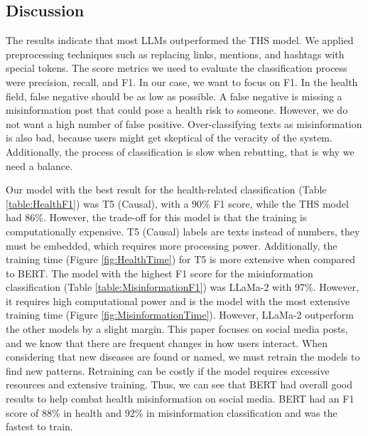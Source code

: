 \subsection{Discussion}

The results indicate that most LLMs outperformed the THS model. We applied preprocessing techniques such as replacing links, mentions, and hashtags with special tokens.
The score metrics we used to evaluate the classification process were precision, recall, and F1. In our case, we want to focus on F1. In the health field, false negative should be
as low as possible. A false negative is missing a misinformation post that could pose a health risk to someone. However, we do not want a high number of false positive. Over-classifying 
texts as misinformation is also bad, because users might get skeptical of the veracity of the system. Additionally, the process of classification is slow when rebutting, that is why we need a balance.

Our model with the best result for the health-related classification (Table \ref{table:HealthF1}) was T5 (Causal), with a 90\% F1 score, while the THS model had 86\%. However, the trade-off
for this model is that the training is computationally expensive. T5 (Causal) labels are texts instead of numbers, they must be embedded, which requires more processing power. Additionally,
the training time (Figure \ref{fig:HealthTime}) for T5 is more extensive when compared to BERT.
The model with the highest F1 score for the misinformation classification (Table \ref{table:MisinformationF1}) was LLaMa-2 with 97\%. However, it requires high computational power and is
the model with the most extensive training time (Figure \ref{fig:MisinformationTime}). However, LLaMa-2 outperform the other models by a slight margin. 
This paper focuses on social media posts, and we know that there are frequent changes in how users interact. When considering that new diseases are found or named, we must retrain the
models to find new patterns. Retraining can be costly if the model requires excessive resources and extensive training. 
Thus, we can see that BERT had overall good results to help combat health misinformation on social media. BERT had an F1 score of 88\% in health and 92\% in misinformation classification and was the fastest to train.


